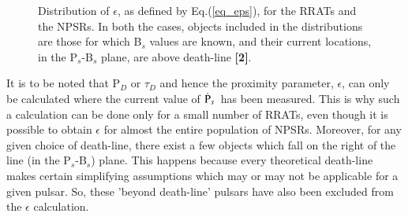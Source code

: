 \documentclass{jaa}
\newcommand{\bef}{\begin{figure}}
\newcommand{\eef}{\end{figure}}
\newcommand{\psdot}{\mbox{$\dot{\rm P}_s$}}
\begin{document}
%
\bef
%
%
\caption{Distribution of $\epsilon$,  as defined by Eq.(\ref{eq_eps}),
  for the RRATs and the NPSRs.  In both the cases, objects included in
  the distributions  are those for  which B$_s$ values are  known, and
  their  current  locations,  in  the  P$_s$-B$_s$  plane,  are  above
  death-line {\bf [2]}. }
%
\label{f_ehst} 
%
\eef
%

It  is to  be noted  that P$_D$  or $\tau_D$  and hence  the proximity
parameter, $\epsilon$, can only be  calculated where the current value
of \psdot~has  been measured.  This  is why  such a calculation  can be
done only for a  small number of RRATs, even though  it is possible to
obtain $\epsilon$ for almost the entire population of NPSRs. Moreover,
for any  given choice of death-line,  there exist a few  objects which
fall on the right of the line (in the P$_s$-B$_s$) plane. This happens
because  every   theoretical  death-line  makes   certain  simplifying
assumptions which  may or may  not be  applicable for a  given pulsar.
So, these 'beyond death-line' pulsars have also been excluded from the
$\epsilon$ calculation.
\end{document}
